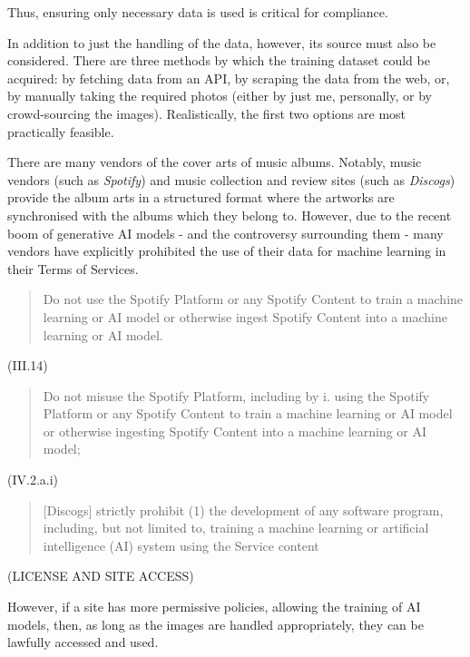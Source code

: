                  Thus, ensuring only necessary data is used is critical for compliance.
    
                  In addition to just the handling of the data, however, its source must also be considered. There are three methods by which the training dataset could be acquired: by fetching data from an API, by scraping the data from the web, or, by manually taking the required photos (either by just me, personally, or by crowd-sourcing the images). Realistically, the first two options are most practically feasible.
    
                  There are many vendors of the cover arts of music albums. Notably, music vendors (such as \textit{Spotify}) and music collection and review sites (such as \textit{Discogs}) provide the album arts in a structured format where the artworks are synchronised with the albums which they belong to. However, due to the recent boom of generative AI models - and the controversy surrounding them \cite{apnews2025mccartney_ai_warning} - many vendors have explicitly prohibited the use of their data for machine learning in their Terms of Services.
    
                  \begin{quote}
                      Do not use the Spotify Platform or any Spotify Content to train a machine learning or AI model or otherwise ingest Spotify Content into a machine learning or AI model.
                  \end{quote} \cite{spotifyDevPolicy} (III.14)
                  \begin{quote}
                      Do not misuse the Spotify Platform, including by i. using the Spotify Platform or any Spotify Content to train a machine learning or AI model or otherwise ingesting Spotify Content into a machine learning or AI model;
                  \end{quote} \cite{spotifyDevTerms} (IV.2.a.i)
                  \begin{quote}
                      [Discogs] strictly prohibit (1) the development of any software program, including, but not limited to, training a machine learning or artificial intelligence (AI) system using the Service content
                  \end{quote} \cite{discogsToS} (LICENSE AND SITE ACCESS)
    
                  However, if a site has more permissive policies, allowing the training of AI models, then, as long as the images are handled appropriately, they can be lawfully accessed and used.
    
